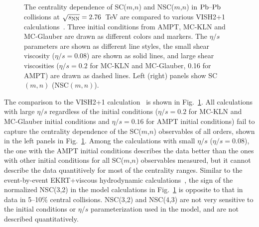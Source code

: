 \begin{figure}[!]
	\begin{center}
        \caption{The centrality dependence of SC($m$,$n$) and NSC($m$,$n$) in $\textnormal{Pb--Pb}$ collisions at $\sqrt{s_{\textnormal{NN}}}=2.76$~TeV are compared to various VISH2+1 calculations~\cite{Zhu:2016puf}. Three initial conditions from AMPT, MC-KLN and MC-Glauber are drawn as different colors and markers. The $\eta/s$ parameters are shown as different line styles, the small shear viscosity ($\eta/s=0.08$) are shown as solid lines, and large shear viscosities ($\eta/s=0.2$ for MC-KLN and MC-Glauber, 0.16 for AMPT) are drawn as dashed lines. Left (right) panels show SC$(m,n)$ (NSC$(m,n)$).}
        \label{fig:Figure_4}
        \end{center}   
 \end{figure}
 
The comparison to the VISH2+1 calculation~\cite{Zhu:2016puf} is shown in Fig.~\ref{fig:Figure_4}.  All calculations with large $\eta/s$ regardless of the initial conditions ($\eta/s=0.2$ for MC-KLN and MC-Glauber initial conditions and $\eta/s=0.16$ for AMPT initial conditions) fail to capture the centrality dependence of the SC($m$,$n$) observables of all orders, shown in the left panels in Fig.~\ref{fig:Figure_4}.
Among the calculations with small $\eta/s$ ($\eta/s=0.08$), the one with the AMPT initial conditions describes the data better than the ones with other initial conditions for all SC($m$,$n$) observables measured, but it cannot describe the data quantitively for most of the centrality ranges.
Similar to the event-by-event EKRT+viscous hydrodynamic calculations~\cite{Niemi:2015qia}, the sign of the normalized NSC(3,2) in the model calculations in Fig.~\ref{fig:Figure_4} is opposite to that in data in 5--10\% central collisions. 
NSC(3,2) and NSC(4,3) are not very sensitive to the initial conditions or $\eta/s$ parameterization used in the model, and are not described quantitatively.

